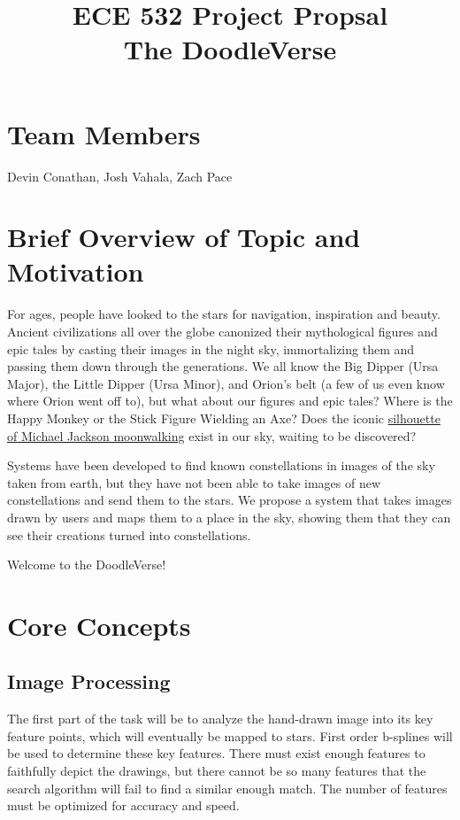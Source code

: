 \documentclass{article}
\title{
\horrule{1pt}
ECE 532 Project Propsal\\\vspace{1cm}\huge \textbf{The DoodleVerse}
\horrule{0.5pt}
}
\date{}
\makeatletter
\let\saved@bibitem\@bibitem
\makeatother
\begin{document}
\begingroup
  \makeatletter
  \let\@bibitem\saved@bibitem
  
\endgroup
\maketitle
\section{Team Members}
Devin Conathan, Josh Vahala, Zach Pace 

\section{Brief Overview of Topic and Motivation}
For ages, people have looked to the stars for navigation, inspiration and beauty. Ancient civilizations all over the globe canonized their mythological figures and epic tales by casting their images in the night sky, immortalizing them and passing them down through the generations.  We all know the Big Dipper (Ursa Major), the Little Dipper (Ursa Minor), and Orion's belt (a few of us even know where Orion went off to), but what about our figures and epic tales?  Where is the Happy Monkey or the Stick Figure Wielding an Axe?  Does the iconic \href{http://cliparts.co/cliparts/qiB/yEg/qiByEg5i5.jpg}{silhouette of Michael Jackson moonwalking} exist in our sky, waiting to be discovered?

Systems have been developed to find known constellations in images of the sky taken from earth, but they have not been able to take images of new constellations and send them to the stars. We propose a system that takes images drawn by users and maps them to a place in the sky, showing them that they can see their creations turned into constellations.

Welcome to the DoodleVerse!
\section{Core Concepts}

\subsection{Image Processing}
The first part of the task will be to analyze the hand-drawn image into its key feature points, which will eventually be mapped to stars. First order b-splines will be used to determine these key features. There must exist enough features to faithfully depict the drawings, but there cannot be so many features that the search algorithm will fail to find a similar enough match. The number of features must be optimized for accuracy and speed.
\end{document}
